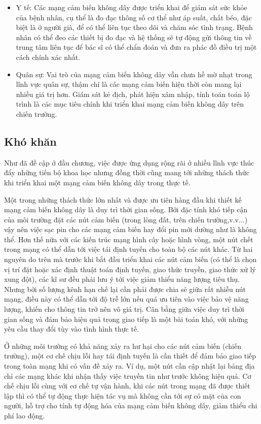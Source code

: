 \begin{itemize}
\item Y tế: Các mạng cảm biến không dây được triển khai để giám sát sức khỏe của bệnh nhân, cụ thể là đo đạc thông số cơ thể như áp suất, chất béo, đặc biệt là ở người già, để có thể liên tục theo dõi và chăm sóc tình trạng. Bệnh nhân có thể đeo các thiết bị đo đạc và hệ thống sẽ tự động gửi thông tin về trung tâm liên tục để bác sĩ có thể chẩn đoán và đưa ra phác đồ điều trị một cách chính xác nhất.
\item Quân sự: Vai trò của mạng cảm biến không dây vẫn chưa hề mờ nhạt trong lĩnh vực quân sự, thậm chí là các mạng cảm biến hiện thời còn mang lại nhiều giá trị hơn. Giám sát kẻ địch, phát hiện xâm nhập, tính toán toán lộ trình là các mục tiêu chính khi triển khai mạng cảm biến không dây trên chiến trường.
\end{itemize}

\subsection{Khó khăn}
Như đã đề cập ở đầu chương, việc được ứng dụng rộng rãi ở nhiều lĩnh vực thúc đẩy những tiến bộ khoa học nhưng đồng thời cũng mang tới những thách thức khi triển khai một mạng cảm biến không dây trong thực tế. \cite{eisa2013challenges}


Một trong những thách thức lớn nhất và được ưu tiên hàng đầu khi thiết kế mạng cảm biến không dây là duy trì thời gian sống. Bởi đặc tính khó tiếp cận của môi trường đặt các nút cảm biến (trong lòng đất, trên chiến trường,v.v...) vậy nên việc sạc pin cho các mạng cảm biến hay đổi pin mới dường như là không thể. Hơn thế nữa với các kiến trúc mạng hình cây hoặc hình vòng, một nút chết trong mạng có thể dẫn tới việc tái định tuyến cho toàn bộ các nút khác. Từ hai nguyên do trên mà trước khi bắt đầu triển khai các nút cảm biến (có thể là chọn vị trí đặt hoặc xác định thuật toán định tuyến, giao thức truyền, giao thức xử lý xung đột), các kĩ sư đều phải lưu ý tới việc giảm thiểu năng lượng tiêu thụ. Nhưng bởi số lượng kênh hạn chế lại cần phải được chia sẻ giữa rất nhiều nút mạng, điều này có thể dẫn tới độ trễ lớn nếu quá ưu tiên vào việc bảo vệ năng lượng, khiến cho thông tin trở nên vô giá trị. Cân bằng giữa việc duy trì thời gian sống và đảm bảo hiệu quả trong giao tiếp là một bài toán khó, với những yêu cầu thay đổi tùy vào tình hình thực tế.


Ở những môi trường có khả năng xảy ra hư hại cho các nút cảm biến (chiến trường), một cơ chế chịu lỗi hay tái định tuyến là cần thiết để đảm bảo giao tiếp trong toàn mạng khi có vấn đề xảy ra. Ví dụ, một nút cần cập nhật lại bảng địa chỉ các mạng khác khi nhận thấy việc truyền tin như trước không hiệu quả. Cơ chế chịu lỗi cùng với cơ chế tự vận hành, khi các nút trong mạng đã được thiết lập thì có thể tự động thực hiện tác vụ mà không cần tới sự có mặt của con người, hỗ trợ cho tính tự động hóa của mạng cảm biến không dây, giảm thiểu chi phí lao động.
 


